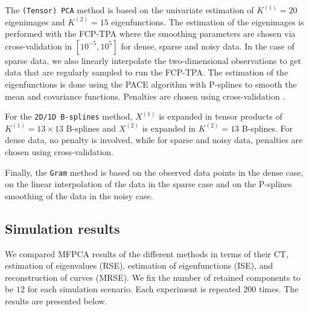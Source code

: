 The \texttt{(Tensor) PCA} method is based on the univariate estimation of $K^{(1)} = 20$ eigenimages and $K^{(2)} = 15$ eigenfunctions. The estimation of the eigenimages is performed with the FCP-TPA where the smoothing parameters are chosen via cross-validation in $[10^{-5}, 10^5]$ for dense, sparse and noisy data. In the case of sparse data, we also linearly interpolate the two-dimensional observations to get data that are regularly sampled to run the FCP-TPA. The estimation of the eigenfunctions is done using the PACE algorithm \citep{yaoFunctionalDataAnalysis2005} with P-splines to smooth the mean and covariance functions. Penalties are chosen using cross-validation \citep{eilersFlexibleSmoothingBsplines1996}.

For the \texttt{2D/1D B-splines} method, $X^{(1)}$ is expanded in tensor products of $K^{(1)} = 13 \times 13$ B-splines and $X^{(2)}$ is expanded in $K^{(2)} = 13$ B-splines. For dense data, no penalty is involved, while for sparse and noisy data, penalties are chosen using cross-validation.

Finally, the \texttt{Gram} method is based on the observed data points in the dense case, on the linear interpolation of the data in the sparse case \citep{benkoCommonFunctionalPrincipal2009} and on the P-splines smoothing of the data in the noisy case.



\subsection{Simulation results} %
\label{sub:simulation_results}

We compared MFPCA results of the different methods in terms of their CT, estimation of eigenvalues (RSE), estimation of eigenfunctions (ISE), and reconstruction of curves (MRSE). We fix the number of retained components to be $12$ for each simulation scenario. Each experiment is repeated $200$ times. The results are presented below.

